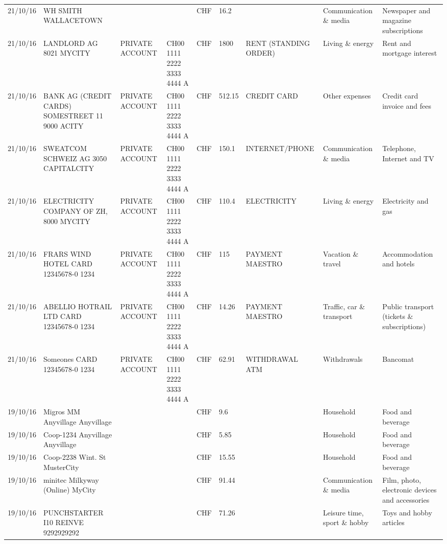 \begin{landscape}
\begin{center}
\begin{longtable}{lllllllll}
		21/10/16 & WH SMITH                 WALLACETOWN &       &       & CHF   & 16.2  &       & Communication \& media & Newspaper and magazine subscriptions \\
		21/10/16 & LANDLORD AG 8021 MYCITY & PRIVATE ACCOUNT & CH00 1111 2222 3333 4444 A & CHF   & 1800  & RENT (STANDING ORDER) & Living \& energy & Rent and mortgage interest \\
		21/10/16 & BANK AG (CREDIT CARDS) SOMESTREET 11 9000 ACITY & PRIVATE ACCOUNT & CH00 1111 2222 3333 4444 A & CHF   & 512.15 & CREDIT CARD & Other expenses & Credit card invoice and fees \\
		21/10/16 & SWEATCOM SCHWEIZ AG 3050 CAPITALCITY & PRIVATE ACCOUNT & CH00 1111 2222 3333 4444 A & CHF   & 150.1 & INTERNET/PHONE & Communication \& media & Telephone,  Internet and TV \\
		21/10/16 & ELECTRICITY COMPANY OF ZH, 8000 MYCITY & PRIVATE ACCOUNT & CH00 1111 2222 3333 4444 A & CHF   & 110.4 & ELECTRICITY & Living \& energy & Electricity and gas \\
		21/10/16 & FRARS WIND HOTEL CARD 12345678-0 1234 & PRIVATE ACCOUNT & CH00 1111 2222 3333 4444 A & CHF   & 115   & PAYMENT MAESTRO & Vacation \& travel & Accommodation and hotels \\
		21/10/16 & ABELLIO HOTRAIL LTD CARD 12345678-0 1234 & PRIVATE ACCOUNT & CH00 1111 2222 3333 4444 A & CHF   & 14.26 & PAYMENT MAESTRO & Traffic, car \& transport & Public transport (tickets \& subscriptions) \\
		21/10/16 & Someones CARD 12345678-0 1234 & PRIVATE ACCOUNT & CH00 1111 2222 3333 4444 A & CHF   & 62.91 & WITHDRAWAL ATM & Withdrawals & Bancomat \\
		19/10/16 & Migros MM Anyvillage    Anyvillage &       &       & CHF   & 9.6   &       & Household & Food and beverage \\
		19/10/16 & Coop-1234 Anyvillage    Anyvillage &       &       & CHF   & 5.85  &       & Household & Food and beverage \\
		19/10/16 & Coop-2238 Wint. St       MusterCity &       &       & CHF   & 15.55 &       & Household & Food and beverage \\
		19/10/16 & minitec Milkyway (Online) MyCity &       &       & CHF   & 91.44 &       & Communication \& media & Film, photo, electronic devices and accessories \\
		19/10/16 & PUNCHSTARTER I10 REINVE   9292929292 &       &       & CHF   & 71.26 &       & Leisure time, sport \& hobby & Toys and hobby articles \\

\end{longtable}
\end{center}
\end{landscape}
